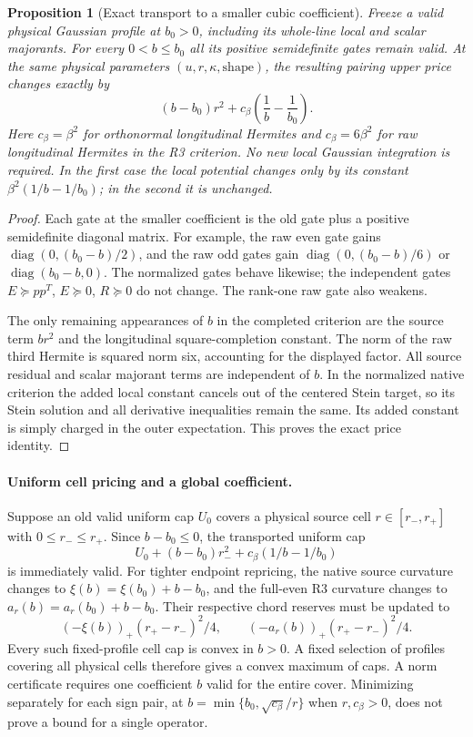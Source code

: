 \documentclass[11pt]{article}
\newtheorem{proposition}[theorem]{Proposition}
\begin{document}
\begin{proposition}[Exact transport to a smaller cubic coefficient]
\label{prop:smaller-b-transport}
Freeze a valid physical Gaussian profile at $b_0>0$, including its
whole-line local and scalar majorants.  For every $0<b\leq b_0$ all
its positive semidefinite gates remain valid.  At the same physical
parameters $(u,r,\kappa,\text{shape})$, the resulting pairing upper
price changes exactly by
\[
 (b-b_0)r^2+c_\beta\left(\frac1b-\frac1{b_0}\right).
\]
Here $c_\beta=\beta^2$ for orthonormal longitudinal Hermites and
$c_\beta=6\beta^2$ for raw longitudinal Hermites in the R3 criterion.
No new local Gaussian integration is required.  In the first case
the local potential changes only by its constant
$\beta^2(1/b-1/b_0)$; in the second it is unchanged.
\end{proposition}
\begin{proof}
Each gate at the smaller coefficient is the old gate plus a positive
semidefinite diagonal matrix.  For example, the raw even gate gains
$\operatorname{diag}(0,(b_0-b)/2)$, and the raw odd gates gain
$\operatorname{diag}(0,(b_0-b)/6)$ or
$\operatorname{diag}(b_0-b,0)$.  The normalized gates behave likewise;
the independent gates $E\succeq pp^T$, $E\succeq0$, $R\succeq0$
do not change.  The rank-one raw gate also weakens.

The only remaining appearances of $b$ in the completed criterion are
the source term $br^2$ and the longitudinal square-completion constant.
The norm of the raw third Hermite is squared norm six, accounting for
the displayed factor.  All source residual and scalar majorant terms
are independent of $b$.  In the normalized native criterion the added
local constant cancels out of the centered Stein target, so its Stein
solution and all derivative inequalities remain the same.  Its added
constant is simply charged in the outer expectation.  This proves the
exact price identity.
\end{proof}

\paragraph{Uniform cell pricing and a global coefficient.}
Suppose an old valid uniform cap $U_0$ covers a physical source cell
$r\in[r_-,r_+]$ with $0\le r_-\le r_+$. Since $b-b_0\leq0$, the transported uniform cap
\[
 U_0+(b-b_0)r_-^2+c_\beta(1/b-1/b_0)
\]
is immediately valid.  For tighter endpoint repricing, the native
source curvature changes to $\xi(b)=\xi(b_0)+b-b_0$, and the full-even
R3 curvature changes to $a_r(b)=a_r(b_0)+b-b_0$.  Their respective
chord reserves must be updated to
\[
 (-\xi(b))_+(r_+-r_-)^2/4,
 \qquad (-a_r(b))_+(r_+-r_-)^2/4.
\]
Every such fixed-profile cell cap is convex in $b>0$.  A fixed
selection of profiles covering all physical cells therefore gives a
convex maximum of caps.  A norm certificate requires one coefficient
$b$ valid for the entire cover.  Minimizing separately for each sign
pair, at $b=\min\{b_0,\sqrt{c_\beta}/r\}$ when $r,c_\beta>0$,
does not prove a bound for a single operator.
\end{document}
